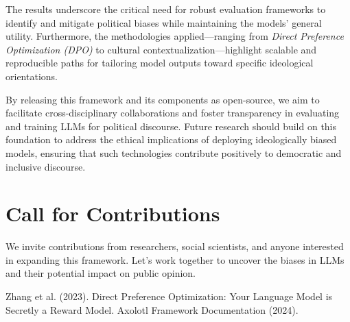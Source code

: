 \documentclass[10pt]{article}
\begin{document}
The results underscore the critical need for robust evaluation frameworks to identify and mitigate political biases while maintaining the models' general utility. Furthermore, the methodologies applied—ranging from \textit{Direct Preference Optimization (DPO)} to cultural contextualization—highlight scalable and reproducible paths for tailoring model outputs toward specific ideological orientations.

By releasing this framework and its components as open-source, we aim to facilitate cross-disciplinary collaborations and foster transparency in evaluating and training LLMs for political discourse. Future research should build on this foundation to address the ethical implications of deploying ideologically biased models, ensuring that such technologies contribute positively to democratic and inclusive discourse.

\section*{Call for Contributions}

We invite contributions from researchers, social scientists, and anyone interested in expanding this framework. Let’s work together to uncover the biases in LLMs and their potential impact on public opinion.


\begin{thebibliography}{9}
 Zhang et al. (2023). Direct Preference Optimization: Your Language Model is Secretly a Reward Model.
 Axolotl Framework Documentation (2024).
\end{thebibliography}
\end{document}
